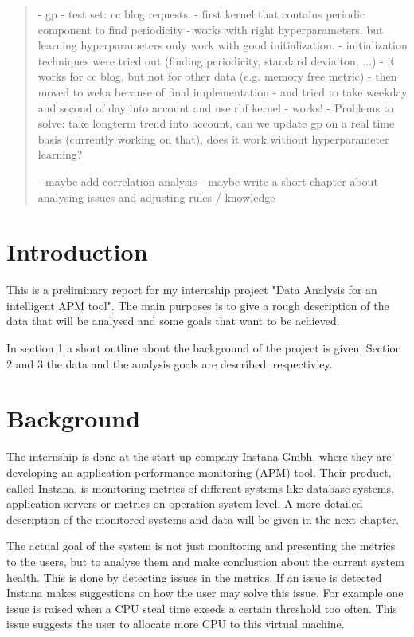 \documentclass[]{article}
\begin{document}
\begin{abstract}
\begin{itemize}
	- gp
	- test set: cc blog requests.
	- first kernel that contains periodic component to find periodicity
	- works with right hyperparameters. but learning hyperparameters only work with good initialization.
	- initialization techniques were tried out (finding periodicity, standard deviaiton, ...)
	- it works for cc blog, but not for other data (e.g. memory free metric)
	- then moved to weka because of final implementation
	- and tried to take weekday and second of day into account and use rbf kernel
	- works!
	- Problems to solve: take longterm trend into account, can we update gp on a real time basis (currently working on  that), does it work without hyperparameter learning?
	
	
	- maybe add correlation analysis
	- maybe write a short chapter about analysing issues and adjusting rules / knowledge  
\end{itemize}

\end{abstract}

\section{Introduction}
This is a preliminary report for my internship project "Data Analysis for an intelligent APM tool".
The main purposes is to give a rough description of the data that will be analysed and some goals that want to be achieved.

In section 1 a short outline about the background of the project is given.
Section 2 and 3 the data and the analysis goals are described, respectivley.

\section{Background}
The internship is done at the start-up company Instana Gmbh, where they are developing an application performance monitoring (APM) tool.
Their product, called Instana, is monitoring metrics of different systems like database systems, application servers or metrics on operation system level.
A more detailed description of the monitored systems and data will be given in the next chapter.

The actual goal of the system is not just monitoring and presenting the metrics to the users, but to analyse them and make conclustion about the current system health.
This is done by detecting issues in the metrics.
If an issue is detected Instana makes suggestions on how the user may solve this issue.
For example one issue is raised when a CPU steal time exeeds a certain threshold too often.
This issue suggests the user to allocate more CPU to this virtual machine.
\end{document}
